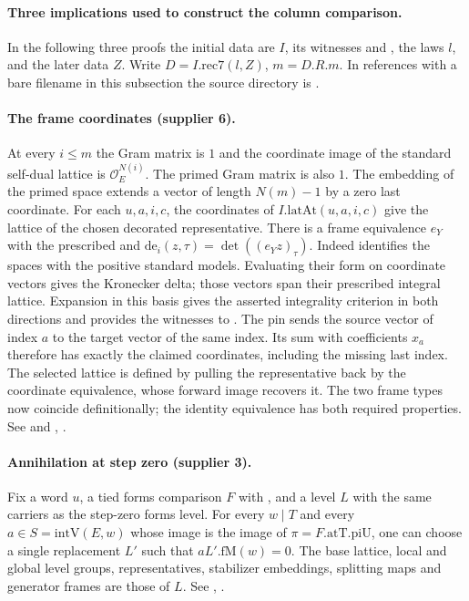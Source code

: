 \paragraph{Three implications used to construct the column comparison.}
In the following three proofs the initial data are $I$, its witnesses
 and , the laws $l$, and the later data $Z$. Write
$D=I.\mathrm{rec7}(l,Z)$, $m=D.R.m$. In references with a bare filename
in this subsection the source directory is
.

\paragraph{The frame coordinates (supplier 6).}
At every $i\le m$ the Gram matrix is $1$ and the coordinate image of the
standard self-dual lattice is $\mathcal O_E^{N(i)}$. The primed Gram
matrix is also $1$. The embedding of the primed space extends a vector
of length $N(m)-1$ by a zero last coordinate. For each $u,a,i,c$, the
coordinates of $I.\mathrm{latAt}(u,a,i,c)$ give the lattice of the
chosen decorated representative. There is a frame equivalence $e_Y$
with the prescribed  and
$\mathrm{de}_i(z,\tau)=\det((e_Yz)_\tau)$.
Indeed  identifies the spaces with the positive standard
models. Evaluating their form on coordinate vectors gives the Kronecker
delta; those vectors span their prescribed integral lattice. Expansion
in this basis gives the asserted integrality criterion in both
directions and provides the witnesses to . The pin
 sends the source vector of index $a$ to the target vector
of the same index. Its sum with coefficients $x_a$ therefore has
exactly the claimed coordinates, including the missing last index.
The selected lattice is defined by pulling the representative back by
the coordinate equivalence, whose forward image recovers it. The two
frame types now coincide definitionally; the identity equivalence has
both required properties. See  and
,
.

\paragraph{Annihilation at step zero (supplier 3).}
Fix a word $u$, a tied forms comparison $F$ with , and a
level $L$ with the same carriers as the step-zero forms level.
For every $w\mid T$ and every $a\in S=\mathrm{intV}(E,w)$ whose image
is the image of $\pi=F.\mathrm{atT}.\mathrm{piU}$, one can choose a
single replacement $L'$ such that $aL'.\mathrm{fM}(w)=0$.
The base lattice, local and global level groups, representatives,
stabilizer embeddings, splitting maps and generator frames are those of $L$.
See ,
.

